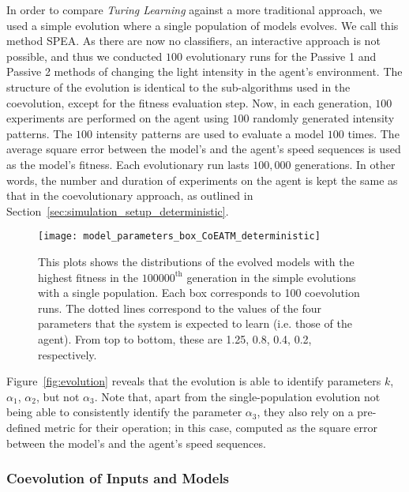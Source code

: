 In order to compare \textit{Turing Learning} against a more traditional approach, we used a simple evolution where a single population of models evolves. We call this method SPEA. As there are now no classifiers, an interactive approach is not possible, and thus we conducted $100$ evolutionary runs for the Passive 1 and Passive 2 methods of changing the light intensity in the agent's environment. The structure of the evolution is identical to the sub-algorithms used in the coevolution, except for the fitness evaluation step. Now, in each generation, $100$ experiments are performed on the agent using $100$ randomly generated intensity patterns. The $100$ intensity patterns are used to evaluate a model $100$ times. The average square error between the model's and the agent's speed sequences is used as the model's fitness. Each evolutionary run lasts $100,000$ generations. In other words, the number and duration of experiments on the agent is kept the same as that in the coevolutionary approach, as outlined in Section~\ref{sec:simulation_setup_deterministic}.

\begin{figure}[!t]
	\centering
	\texttt{[image: model\_parameters\_box\_CoEATM\_deterministic]}
	\caption{This plots shows the distributions of the evolved models with the highest fitness in the $100000^\textrm{th}$ generation in the simple evolutions with a single population. Each box corresponds to 100 coevolution runs. The dotted lines correspond to the values of the four parameters that the system is expected to learn (i.e. those of the agent). From top to bottom, these are 1.25, 0.8, 0.4, 0.2, respectively. \label{fig:model_parameters_box_CoEATM_deterministic}}
\end{figure}

Figure~\ref{fig:evolution} reveals that the evolution is able to identify parameters $k$, $\alpha_1$, $\alpha_2$, but not $\alpha_3$. Note that, apart from the single-population evolution not being able to consistently identify the parameter $\alpha_3$, they also rely on a pre-defined metric for their operation; in this case, computed as the square error between the model's and the agent's speed sequences. 

\subsubsection{Coevolution of Inputs and Models}\label{sec:coevolution_inputs_and_models_deterministic_interaction}

